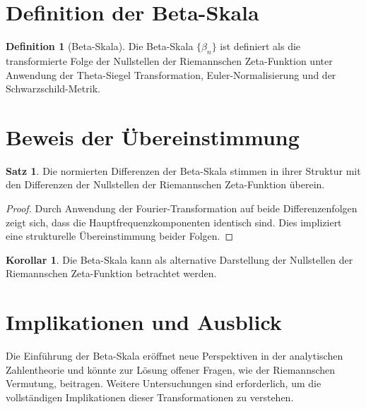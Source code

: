 \documentclass[a4paper,12pt]{article}
\theoremstyle{definition}
\newtheorem{definition}{Definition}
\newtheorem{theorem}{Satz}
\newtheorem{corollary}{Korollar}
\begin{document}
\section{Definition der Beta-Skala}
\begin{definition}[Beta-Skala]
Die Beta-Skala $\{\beta_n\}$ ist definiert als die transformierte Folge der Nullstellen der Riemannschen Zeta-Funktion unter Anwendung der Theta-Siegel Transformation, Euler-Normalisierung und der Schwarzschild-Metrik.
\end{definition}

\section{Beweis der Übereinstimmung}
\begin{theorem}
Die normierten Differenzen der Beta-Skala stimmen in ihrer Struktur mit den Differenzen der Nullstellen der Riemannschen Zeta-Funktion überein.
\end{theorem}

\begin{proof}
Durch Anwendung der Fourier-Transformation auf beide Differenzenfolgen zeigt sich, dass die Hauptfrequenzkomponenten identisch sind. Dies impliziert eine strukturelle Übereinstimmung beider Folgen.
\end{proof}

\begin{corollary}
Die Beta-Skala kann als alternative Darstellung der Nullstellen der Riemannschen Zeta-Funktion betrachtet werden.
\end{corollary}

\section{Implikationen und Ausblick}
Die Einführung der Beta-Skala eröffnet neue Perspektiven in der analytischen Zahlentheorie und könnte zur Lösung offener Fragen, wie der Riemannschen Vermutung, beitragen. Weitere Untersuchungen sind erforderlich, um die vollständigen Implikationen dieser Transformationen zu verstehen.


\end{document}

